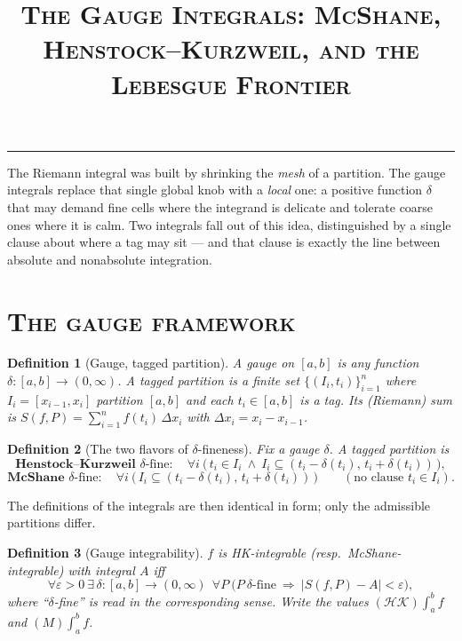 \documentclass[11pt]{article}
\title{\scshape\color{atlasink} The Gauge Integrals: McShane, Henstock--Kurzweil,
and the Lebesgue Frontier}
\author{}\date{}
\theoremstyle{atlas}
\newtheorem{definition}{Definition}
\newcommand{\HK}{\mathcal{HK}}
\begin{document}
\maketitle
\vspace{-3.2em}
{\color{atlasink}\rule{\linewidth}{0.8pt}}
\vspace{1em}

The Riemann integral was built by shrinking the \emph{mesh} of a partition. The gauge
integrals replace that single global knob with a \emph{local} one: a positive function
$\delta$ that may demand fine cells where the integrand is delicate and tolerate coarse
ones where it is calm. Two integrals fall out of this idea, distinguished by a single
clause about where a tag may sit --- and that clause is exactly the line between
absolute and nonabsolute integration.

\section*{\scshape The gauge framework}

\begin{definition}[Gauge, tagged partition]
A \emph{gauge} on $[a,b]$ is any function $\delta:[a,b]\to(0,\infty)$. A \emph{tagged
partition} is a finite set $\{(I_i,t_i)\}_{i=1}^{n}$ where $I_i=[x_{i-1},x_i]$ partition
$[a,b]$ and each $t_i\in[a,b]$ is a \emph{tag}. Its \emph{(Riemann) sum} is
$S(f,P)=\sum_{i=1}^n f(t_i)\,\Delta x_i$ with $\Delta x_i=x_i-x_{i-1}$.
\end{definition}

\begin{definition}[The two flavors of $\delta$-fineness]
Fix a gauge $\delta$. A tagged partition is
\[
  \textbf{Henstock--Kurzweil } \delta\text{-fine}:\quad
    \forall i\ \big(\,t_i\in I_i \ \wedge\ I_i\subseteq(t_i-\delta(t_i),\,t_i+\delta(t_i))\,\big),
\]
\[
  \textbf{McShane } \delta\text{-fine}:\quad
    \forall i\ \big(\,I_i\subseteq(t_i-\delta(t_i),\,t_i+\delta(t_i))\,\big)
    \qquad(\text{no clause } t_i\in I_i).
\]
\end{definition}

The definitions of the integrals are then identical in form; only the admissible
partitions differ.

\begin{definition}[Gauge integrability]
$f$ is \emph{HK-integrable} (resp.\ \emph{McShane-integrable}) with integral $A$ iff
\[
  \forall\varepsilon>0\ \exists\,\delta:[a,b]\to(0,\infty)\ \ \forall P\ \big(
  P\ \delta\text{-fine}\ \Rightarrow\ |S(f,P)-A|<\varepsilon\big),
\]
where ``$\delta$-fine'' is read in the corresponding sense. Write the values
$(\HK)\!\int_a^b f$ and $(M)\!\int_a^b f$.
\end{definition}
\end{document}
